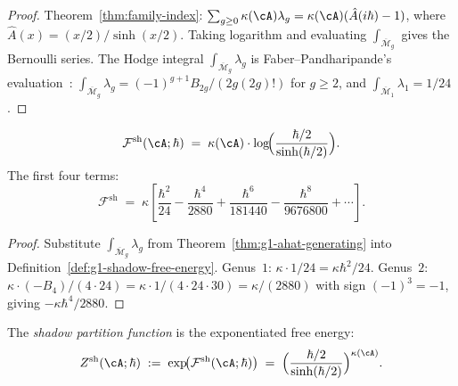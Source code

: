 \begin{proof}
Theorem~\ref{thm:family-index}:
$\sum_{g \geq 0} \kappa(\cA)\lambda_g =
\kappa(\cA)(\hat{A}(i\hbar) - 1)$,
where $\hat{A}(x) = (x/2)/\sinh(x/2)$. Taking logarithm and
evaluating $\int_{\overline{\mathcal{M}}_g}$ gives the
Bernoulli series.  The Hodge integral
$\int_{\overline{\mathcal{M}}_g} \lambda_g$ is
Faber--Pandharipande's evaluation~\cite{FP00}:
$\int_{\overline{\mathcal{M}}_g} \lambda_g =
(-1)^{g+1} B_{2g}/(2g(2g)!)$ for $g \geq 2$, and
$\int_{\overline{\mathcal{M}}_1} \lambda_1 = 1/24$.
\end{proof}

\begin{corollary}%
\label{cor:g1-explicit-free-energy}%
%
\begin{equation}\label{eq:g1-explicit-free-energy}
\mathcal{F}^{\mathrm{sh}}(\cA;\hbar)
\;=\;
\kappa(\cA) \cdot
\log\!\Bigl(
\frac{\hbar/2}{\sinh(\hbar/2)}
\Bigr).
\end{equation}
The first four terms:
\begin{equation}\label{eq:g1-free-energy-terms}
\mathcal{F}^{\mathrm{sh}}
\;=\;
\kappa\!\left[
\frac{\hbar^2}{24}
- \frac{\hbar^4}{2880}
+ \frac{\hbar^6}{181440}
- \frac{\hbar^8}{9676800}
+ \cdots
\right].
\end{equation}
\end{corollary}

\begin{proof}
Substitute $\int_{\overline{\mathcal{M}}_g}\lambda_g$
from Theorem~\ref{thm:g1-ahat-generating} into
Definition~\ref{def:g1-shadow-free-energy}.
Genus~$1$: $\kappa \cdot 1/24 = \kappa \hbar^2/24$.
Genus~$2$: $\kappa \cdot (-B_4)/(4 \cdot 24) =
\kappa \cdot 1/(4 \cdot 24 \cdot 30) = \kappa/(2880)$
with sign $(-1)^3 = -1$, giving $-\kappa\hbar^4/2880$.
\end{proof}

\begin{definition}%
\label{def:g1-shadow-partition}%
%
The \emph{shadow partition function} is the
exponentiated free energy:
\begin{equation}\label{eq:g1-shadow-partition}
Z^{\mathrm{sh}}(\cA;\hbar)
\;:=\;
\exp\!\bigl(\mathcal{F}^{\mathrm{sh}}(\cA;\hbar)\bigr)
\;=\;
\Bigl(\frac{\hbar/2}{\sinh(\hbar/2)}\Bigr)^{\kappa(\cA)}.
\end{equation}
\end{definition}

